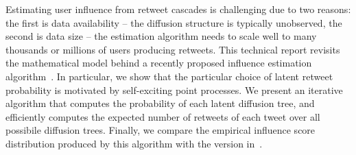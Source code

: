 %
Estimating user influence from retweet cascades is challenging
due to two reasons:
the first is data availability -- the diffusion structure is typically unobserved,
the second is data size -- the estimation algorithm needs to scale well to
many thousands or millions of users producing retweets.
This technical report revisits the mathematical model behind a recently proposed
influence estimation algorithm~\citep{Rizoiu2018a}.
In particular, we show that the particular choice of latent retweet probability
is motivated by self-exciting point processes.
We present an iterative algorithm that computes the probability of each
latent diffusion tree, and efficiently computes the expected number of retweets
of each tweet over all possibile diffusion trees.
Finally, we compare the empirical influence score distribution produced by this algorithm with the version in~\citep{Rizoiu2018a}.
